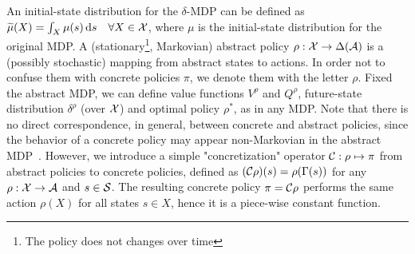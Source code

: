 %
\noindent An initial-state distribution for the $\delta$-\ac{MDP} can be defined as $\widetilde{\mu}(X) = \int_{X}\mu(s)\,\mathrm{d} s\quad\forall X\in\mathcal{X}$, where $\mu$ is the initial-state distribution for the original \ac{MDP}.
%
A (stationary\footnote{The policy does not changes over time}, Markovian) abstract policy $\rho: \mathcal{X} \to \Delta(\mathcal{A})$ is a (possibly stochastic) mapping from abstract states to actions. In order not to confuse them with concrete policies $\pi$, we denote them with the letter $\rho$. Fixed the abstract \ac{MDP}, we can define value functions $V^{\rho}$ and $Q^{\rho}$, future-state distribution $\delta^{\rho}$ (over $\mathcal{X}$) and optimal policy $\rho^{*}$, as in any \ac{MDP}. Note that there is no direct correspondence, in general, between concrete and abstract policies, since the behavior of a concrete policy may appear non-Markovian in the abstract \ac{MDP}~\citep{lihong2006towards}.
However, we introduce a simple "concretization" operator $\mathcal{C}: \rho \mapsto \pi$ from abstract policies to concrete policies, defined as
$(\mathcal{C}\rho)(s) = \rho(\Gamma(s))$
for any $\rho:\mathcal{X}\to\mathcal{A}$ and $s\in\mathcal{S}$. The resulting concrete policy $\pi = \mathcal{C}\rho$ performs the same action $\rho(X)$ for all states $s\in X$, hence it is a piece-wise constant function.

